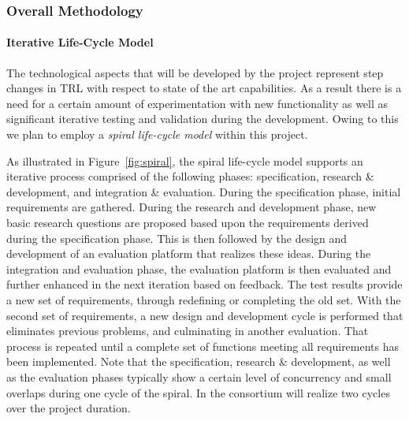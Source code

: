 %


\subsubsection{Overall Methodology}
\label{sec:workoverview}

\paragraph{\textbf{Iterative Life-Cycle Model}}

The technological aspects that will be developed by the \Project{} project represent step changes in TRL with respect to state of the art capabilities. As a result there is a need for a certain amount of experimentation with new functionality as well as significant iterative testing and validation during the development. Owing to this we plan to employ a \emph{spiral life-cycle model} within this project.

As illustrated in Figure~\ref{fig:spiral}, the spiral life-cycle model supports an iterative process comprised of the following phases: specification, research \& development, and integration \& evaluation. During the specification phase, initial requirements are gathered.  During the research and development phase, new basic research questions are proposed based upon the requirements derived during the specification phase.  This is then followed by the design and development of an evaluation platform that realizes these ideas.  During the integration and evaluation phase, the evaluation platform is then evaluated and further enhanced in the next iteration based on feedback.  The test results provide a new set of requirements, through redefining or completing the old set. With the second set of requirements, a new design and development cycle is performed that eliminates previous problems, and culminating in another evaluation.  That process is repeated until a complete set of functions meeting all requirements has been implemented.  Note that the specification, research \& development, as well as the evaluation phases typically show a certain level of concurrency and small overlaps during one cycle of the spiral.  In \Project{} the consortium will realize two cycles over the project duration.

